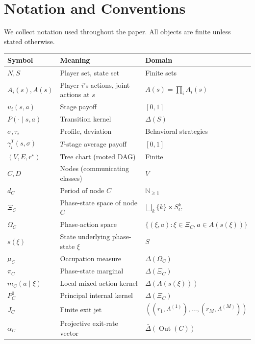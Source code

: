 \documentclass[12pt,a4paper]{article}
\theoremstyle{definition}
\newcommand{\N}{\mathbb{N}}
\DeclareMathOperator{\Out}{Out}
\begin{document}
\section{Notation and Conventions}
\label{sec:notation}

We collect notation used throughout the paper.  All objects are finite unless stated otherwise.

\begin{center}
\begin{tabular}{lll}
\toprule
\textbf{Symbol} & \textbf{Meaning} & \textbf{Domain} \\
\midrule
$N, S$ & Player set, state set & Finite sets \\
$A_i(s), A(s)$ & Player $i$'s actions, joint actions at $s$ & $A(s) = \prod_i A_i(s)$ \\
$u_i(s,a)$ & Stage payoff & $[0,1]$ \\
$P(\cdot \mid s,a)$ & Transition kernel & $\Delta(S)$ \\
$\sigma, \tau_i$ & Profile, deviation & Behavioral strategies \\
$\gamma_i^T(s, \sigma)$ & $T$-stage average payoff & $[0,1]$ \\
\midrule
$(V, E, r^\star)$ & Tree chart (rooted DAG) & Finite \\
$C, D$ & Nodes (communicating classes) & $V$ \\
$d_C$ & Period of node $C$ & $\N_{\geq 1}$ \\
$\Xi_C$ & Phase-state space of node $C$ & $\bigsqcup_k \{k\} \times S_C^k$ \\
$\Omega_C$ & Phase-action space & $\{(\xi, a) : \xi \in \Xi_C, a \in A(s(\xi))\}$ \\
$s(\xi)$ & State underlying phase-state $\xi$ & $S$ \\
\midrule
$\mu_C$ & Occupation measure & $\Delta(\Omega_C)$ \\
$\pi_C$ & Phase-state marginal & $\Delta(\Xi_C)$ \\
$m_C(a \mid \xi)$ & Local mixed action kernel & $\Delta(A(s(\xi)))$ \\
$P_C^0$ & Principal internal kernel & $\Delta(\Xi_C)$ \\
\midrule
$J_C$ & Finite exit jet & $((r_1, \Lambda^{(1)}), \ldots, (r_M, \Lambda^{(M)}))$ \\
$\alpha_C$ & Projective exit-rate vector & $\bar\Delta(\Out(C))$ \\

\end{tabular}
\end{center}
\end{document}
